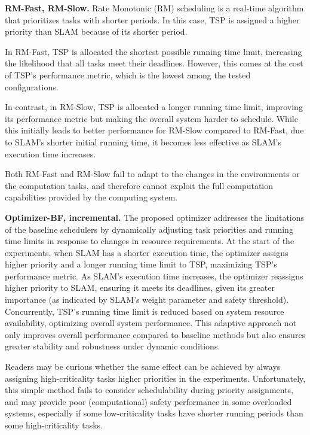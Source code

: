 	
	\textbf{RM-Fast, RM-Slow.} Rate Monotonic (RM) scheduling is a real-time algorithm that prioritizes tasks with shorter periods. In this case, TSP is assigned a higher priority than SLAM because of its shorter period.
    
    In RM-Fast, TSP is allocated the shortest possible running time limit, increasing the likelihood that all tasks meet their deadlines. However, this comes at the cost of TSP's performance metric, which is the lowest among the tested configurations. 
    
    In contrast, in RM-Slow, TSP is allocated a longer running time limit, improving its performance metric but making the overall system harder to schedule. While this initially leads to better performance for RM-Slow compared to RM-Fast, due to SLAM's shorter initial running time, it becomes less effective as SLAM's execution time increases. 
    
    Both RM-Fast and RM-Slow fail to adapt to the changes in the environments or the computation tasks, and therefore cannot exploit the full computation capabilities provided by the computing system.
	
	\textbf{Optimizer-BF, incremental.} 
    The proposed optimizer addresses the limitations of the baseline schedulers by dynamically adjusting task priorities and running time limits in response to changes in resource requirements.
    At the start of the experiments, when SLAM has a shorter execution time, the optimizer assigns higher priority and a longer running time limit to TSP, maximizing TSP's performance metric.
    As SLAM's execution time increases, the optimizer reassigns higher priority to SLAM, ensuring it meets its deadlines, given its greater importance (as indicated by SLAM's weight parameter and safety threshold). Concurrently, TSP's running time limit is reduced based on system resource availability, optimizing overall system performance.
    This adaptive approach not only improves overall performance compared to baseline methods but also ensures greater stability and robustness under dynamic conditions.

    Readers may be curious whether the same effect can be achieved by always assigning high-criticality tasks higher priorities in the experiments. Unfortunately, this simple method fails to consider schedulability during priority assignments, and may provide poor (computational) safety performance in some overloaded systems, especially if some low-criticality tasks have shorter running periods than some high-criticality tasks.

